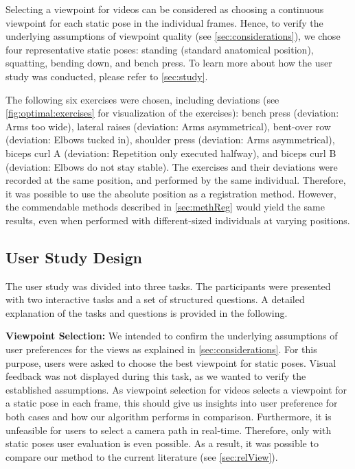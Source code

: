 Selecting a viewpoint for videos can be considered as choosing a continuous viewpoint for each static pose in the individual frames. Hence, to verify the underlying assumptions of viewpoint quality (see \autoref{sec:considerations}), we chose four representative static poses: standing (standard anatomical position), squatting, bending down, and bench press. To learn more about how the user study was conducted, please refer to \autoref{sec:study}.

The following six exercises were chosen, including deviations (see \autoref{fig:optimal:exercises} for visualization of the exercises): bench press (deviation: Arms too wide), lateral raises (deviation: Arms asymmetrical), bent-over row (deviation: Elbows tucked in), shoulder press (deviation: Arms asymmetrical), biceps curl A (deviation: Repetition only executed halfway), and biceps curl B (deviation: Elbows do not stay stable). The exercises and their deviations were recorded at the same position, and performed by the same individual. Therefore, it was possible to use the absolute position as a registration method. However, the commendable methods described in \autoref{sec:methReg} would yield the same results, even when performed with different-sized individuals at varying positions.

\subsection{User Study Design \label{sec:study}}
The user study was divided into three tasks. The participants were presented with two interactive tasks and a set of structured questions. A detailed explanation of the tasks and questions is provided in the following.

\textbf{Viewpoint Selection:} We intended to confirm the underlying assumptions of user preferences for the views as explained in \autoref{sec:considerations}. For this purpose, users were asked to choose the best viewpoint for static poses. Visual feedback was not displayed during this task, as we wanted to verify the established assumptions. As viewpoint selection for videos selects a viewpoint for a static pose in each frame, this should give us insights into user preference for both cases and how our algorithm performs in comparison. Furthermore, it is unfeasible for users to select a camera path in real-time. Therefore, only with static poses user evaluation is even possible. As a result, it was possible to compare our method to the current literature (see \autoref{sec:relView}).

